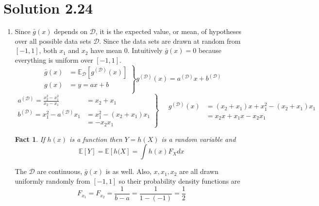 \documentclass[12pt]{article}
\newtheorem{fact}{Fact}
\newcommand{\Data}{\mathcal{D}}
\newcommand{\Expect}{\mathbb{E}}
\newcommand{\gD}{g^{(\Data)}}
\begin{document}
\section*{Solution 2.24}
\begin{enumerate}
    \item
    Since $\bar{g}(x)$ depends on $\Data$, it is the expected value, or mean, of hypotheses over all possible data sets $\Data$.  Since the data sets are drawn at random from $[-1, 1]$, both $x_{1}$ and $x_{2}$ have mean $0$.  Intuitively $\bar{g}(x) = 0$ because everything is uniform over $[-1, 1]$.
    \begin{equation*}
    \left.\begin{aligned}
        \bar{g}(x) &= \Expect_{\Data}[\gD(x)] \\
        g(x) &= y = ax+b \\
    \end{aligned}
    \right\} \gD(x) = a^{(\Data)}x+b^{(\Data)}
    \end{equation*}
    \begin{equation*}
        \left.\begin{aligned}
        a^{(\Data)} = \frac{x_{2}^{2} - x_{1}^{2}}{x_{2} - x_{1}} &= x_{2} + x_{1} \\
        b^{(\Data)} = x_{1}^{2} - a^{(\Data)} x_{1} &= x_{1}^{2} - (x_{2} + x_{1})x_{1}\\
        & = -x_{2}x_{1}
        \end{aligned}
        \right\}
        \begin{aligned}
        \quad
        \gD(x) &= (x_{2} + x_{1})x + x_{1}^{2} - (x_{2} + x_{1})x_{1} \\
        &= x_{2}x + x_{1}x - x_{2}x_{1}
        \end{aligned}
    \end{equation*}
    \begin{fact}
    If $h(x)$ is a function then $Y = h(X)$ is a random variable and
    \begin{equation*}
        \Expect[Y] = \Expect[h(X] = \int h(x) F_{X} dx
    \end{equation*}
    \end{fact}
    The $\Data$ are continuous, $\bar{g}(x)$ is as well.  Also, $x, x_{1}, x_{2}$ are all drawn uniformly randomly from $[-1, 1]$ so their probability density functions are 
    \begin{equation*}
    F_{x_{1}} = F_{x_{2}} = \frac{1}{b-a} = \frac{1}{1 - (-1)} = \frac{1}{2}
    \end{equation*}

\end{enumerate}
\end{document}
